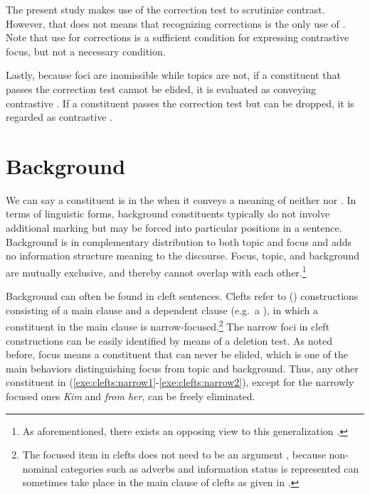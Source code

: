 The present study makes use of the correction test to scrutinize
contrast.  However, that does not means that recognizing corrections
is the only use of . Note that use for corrections is
a sufficient condition for expressing contrastive focus, but not a
necessary condition.


Lastly, because foci are inomissible while topics are not, if a
constituent that passes the correction test cannot be
elided, it is evaluated as conveying contrastive
.  If a constituent passes the correction test but can be
dropped, it is regarded as contrastive .








\section{Background}
\label{3:sec:background}


We can say a constituent is in the  when it conveys a
meaning of neither  nor .  In terms of linguistic forms,
background constituents typically do not involve additional marking
but may be forced into particular positions in a sentence. Background
is in complementary distribution to both topic and focus and adds no
information structure meaning to the discourse. Focus, topic, and
background are mutually exclusive, and thereby cannot overlap with
each other.\footnote{As aforementioned, there exists an opposing view
  to this generalization \citep{krifka:08}.}



Background can often be found in cleft
sentences. Clefts refer to ()
constructions consisting of a main clause and a dependent clause
(e.g.\ a ), in which a constituent in the main
clause is narrow-focused.\footnote{The focused item in clefts does not
  need to be an argument , because non-nominal categories such as
  adverbs and information status is represented can sometimes take place in the main clause of
  clefts as given in .}  The narrow foci in
cleft constructions can be easily identified by means of a deletion
test. As noted before, focus means a constituent
that can never be elided, which is one of the main behaviors
distinguishing focus from topic and background. Thus, any other
constituent in (\ref{exe:clefts:narrow1}-\ref{exe:clefts:narrow2}),
except for the narrowly focused ones \textit{Kim} and \textit{from
  her}, can be freely eliminated.

